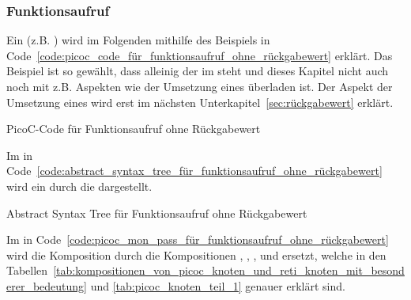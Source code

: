 \subsubsection{Funktionsaufruf}
\label{sec:funktionsaufruf}

Ein  (z.B. ) wird im Folgenden mithilfe des Beispiels in Code~\ref{code:picoc_code_für_funktionsaufruf_ohne_rückgabewert} erklärt. Das Beispiel ist so gewählt, dass alleinig der  im  steht und dieses Kapitel nicht auch noch mit z.B. Aspekten wie der Umsetzung eines  überladen ist. Der Aspekt der Umsetzung eines  wird erst im nächsten Unterkapitel~\ref{sec:rückgabewert} erklärt.


\begin{code}
  \centering
  \caption{PicoC-Code für Funktionsaufruf ohne Rückgabewert}
  \label{code:picoc_code_für_funktionsaufruf_ohne_rückgabewert}
\end{code}

Im  in Code~\ref{code:abstract_syntax_tree_für_funktionsaufruf_ohne_rückgabewert} wird ein   durch die   dargestellt.

\begin{code}
  \centering
  \caption{Abstract Syntax Tree für Funktionsaufruf ohne Rückgabewert}
  \label{code:abstract_syntax_tree_für_funktionsaufruf_ohne_rückgabewert}
\end{code}

Im  in Code~\ref{code:picoc_mon_pass_für_funktionsaufruf_ohne_rückgabewert} wird die Komposition  durch die Kompositionen , , ,  und  ersetzt, welche in den Tabellen~\ref{tab:kompositionen_von_picoc_knoten_und_reti_knoten_mit_besonderer_bedeutung} und \ref{tab:picoc_knoten_teil_1} genauer erklärt sind.

